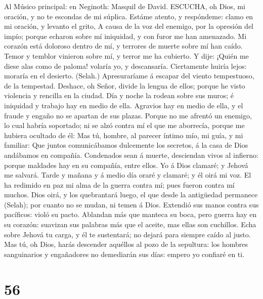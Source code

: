  Al Músico principal: en Neginoth: Masquil de David.
ESCUCHA, oh Dios, mi oración, y no te escondas de mi súplica.
 Estáme atento, y respóndeme: clamo en mi oración, y levanto
el grito,  A causa de la voz del enemigo, por la opresión
del impío; porque echaron sobre mí iniquidad, y con furor me han
amenazado.  Mi corazón está doloroso dentro de mí, y
terrores de muerte sobre mí han caído.  Temor y temblor
vinieron sobre mí, y terror me ha cubierto.  Y dije: ¡Quién
me diese alas como de paloma! volaría yo, y descansaría. 
Ciertamente huiría lejos: moraría en el desierto. (Selah.) 
Apresuraríame á escapar del viento tempestuoso, de la tempestad.
 Deshace, oh Señor, divide la lengua de ellos; porque he
visto violencia y rencilla en la ciudad.  Día y noche la
rodean sobre sus muros; é iniquidad y trabajo hay en medio de ella.
 Agravios hay en medio de ella, y el fraude y engaño no se
apartan de sus plazas.  Porque no me afrentó un enemigo, lo
cual habría soportado; ni se alzó contra mí el que me aborrecía, porque
me hubiera ocultado de él:  Mas tú, hombre, al parecer
íntimo mío, mi guía, y mi familiar:  Que juntos
comunicábamos dulcemente los secretos, á la casa de Dios andábamos en
compañía.  Condenados sean á muerte, desciendan vivos al
infierno: porque maldades hay en su compañía, entre ellos. 
Yo á Dios clamaré; y Jehová me salvará.  Tarde y mañana y á
medio día oraré y clamaré; y él oirá mi voz.  El ha
redimido en paz mi alma de la guerra contra mí; pues fueron contra mí
muchos.  Dios oirá, y los quebrantará luego, el que desde
la antigüedad permanece (Selah); por cuanto no se mudan, ni temen á
Dios.  Extendió sus manos contra sus pacíficos: violó su
pacto.  Ablandan más que manteca su boca, pero guerra hay
en su corazón: suavizan sus palabras más que el aceite, mas ellas son
cuchillos.  Echa sobre Jehová tu carga, y él te sustentará;
no dejará para siempre caído al justo.  Mas tú, oh Dios,
harás descender aquéllos al pozo de la sepultura: los hombres
sanguinarios y engañadores no demediarán sus días: empero yo confiaré en
ti.

\hypertarget{section-55}{%
\section{56}\label{section-55}}

